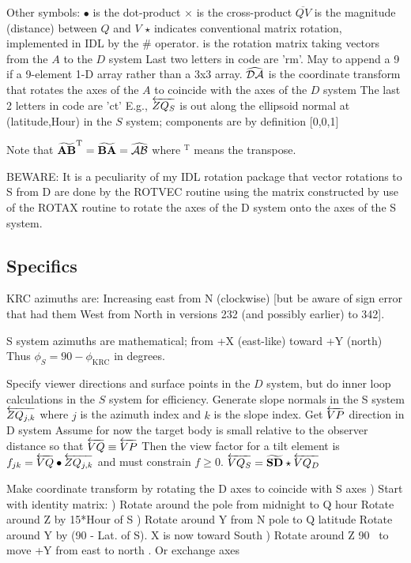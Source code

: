 \documentclass{article}
\begin{document}
\vspace{2.mm}
Other symbols:
\qi $\bullet$ is the dot-product 
\qi $\times$ is the cross-product 
\qi $\overline{QV}$ is the magnitude (distance) between $Q$ and $V$
\qi $\star$ indicates conventional matrix rotation, implemented in IDL by the \#
 operator.
\qi {} is the rotation matrix taking vectors from the $A$ to the $D$ system
\qii Last two letters in code are 'rm'. May to append a 9 if a 9-element 1-D array rather than a 3x3 array.
\qi  $\widehat {\mathcal{DA}}$ is the coordinate transform that rotates the axes of the $A$ to 
coincide with the axes of the $D$ system
\qii  The last 2 letters in code are 'ct'
\qi E.g., $\overleftarrow{ZQ_S}$ is out along the ellipsoid normal at (latitude,Hour) in the $S$ system;  components are by definition [0,0,1] 


Note that $\widetilde {\mathbf{ AB }}^\mathrm{T} = \widetilde {\mathbf{ BA }}  = \widehat {\mathcal{AB}} $
where $^\mathrm{T}$ means the transpose.

BEWARE: It is a peculiarity of my IDL rotation package that vector rotations to
S from D are done by the ROTVEC routine using the  matrix constructed by
use of the ROTAX routine to rotate the axes of the D system onto the axes of the
S system.


\subsection{Specifics \label{geos} }
KRC azimuths are: Increasing east from N (clockwise) [but be aware of sign
  error that had them West from North in versions 232 (and possibly earlier) to
  342].

S system azimuths are mathematical; from +X (east-like) toward +Y (north)
Thus $\phi_S= 90-\phi_\mathrm{KRC}$ in degrees.

 Specify viewer directions and surface points in the $D$ system, but do inner
 loop calculations in the $S$ system for efficiency. Generate slope normals in
 the S system $\overleftarrow{ZQ_{j,k}}$ where $j$ is the azimuth index and $k$ is the
 slope index.
\qi Get $\overleftarrow{VP}  $ direction in D system
\qii Assume for now the target body is small relative to the observer distance so that $\overleftarrow{VQ} \equiv \overleftarrow{VP}$ 
\qi Then the view factor for a tilt element is  $f_{jk}=\overleftarrow{VQ} \bullet \overleftarrow{ZQ_{j,k}} $ and must constrain  $f \geq 0$.
\qi $\overleftarrow{VQ_S} = \widetilde {\mathbf{ SD }} \star  \overleftarrow{VQ_D}$  

Make  coordinate transform by rotating the D axes to coincide with S axes
) Start with identity matrix: 
) Rotate around the pole from midnight to Q hour \qt Rotate around Z by 15*Hour of S
) Rotate around Y from N pole to Q latitude \qt Rotate around Y by (90 - Lat. of S). X is now toward South
) Rotate around Z 90\qd~ to move +Y from east to north \qt . Or exchange axes
\end{document}
